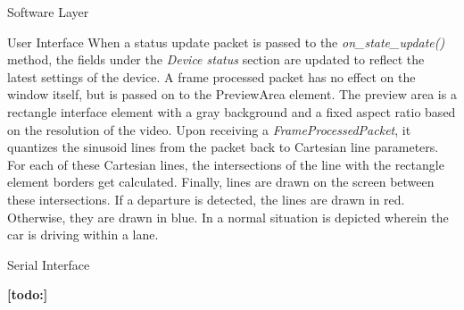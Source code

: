 \documentclass{matthijs}
\begin{document}
\begin{hoofdstuk}{Software Layer}
\begin{paragraaf}{User Interface}
			When a status update packet is passed to the \textit{on\_state\_update(\textellipsis)} method, the fields under the \textit{Device status} section are updated to reflect the latest settings of the device.
			A frame processed packet has no effect on the window itself, but is passed on to the PreviewArea element.
			The preview area is a rectangle interface element with a gray background and a fixed aspect ratio based on the resolution of the video.
			Upon receiving a \textit{FrameProcessedPacket}, it quantizes the sinusoid lines from the packet back to Cartesian line parameters.
			For each of these Cartesian lines, the intersections of the line with the rectangle element borders get calculated.
			Finally, lines are drawn on the screen between these intersections.
			If a departure is detected, the lines are drawn in red.
			Otherwise, they are drawn in blue.
			In  a normal situation is depicted wherein the car is driving within a lane.

		\end{paragraaf}

		\begin{paragraaf}{Serial Interface}

		\end{paragraaf}

		\textbf{[todo:]}

	\end{hoofdstuk}
\end{document}

